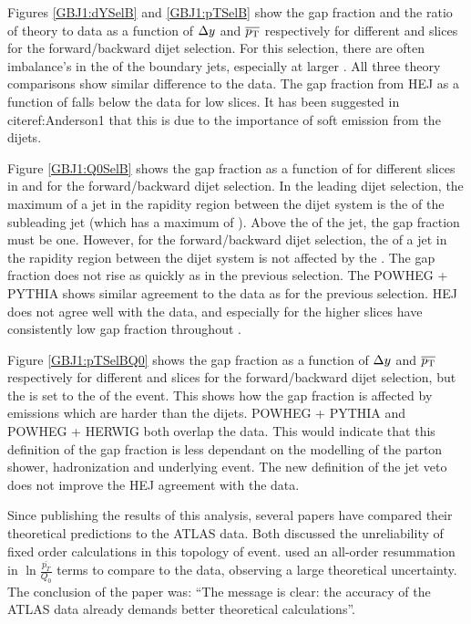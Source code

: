  
Figures \ref{GBJ1:dYSelB} and \ref{GBJ1:pTSelB} show the gap fraction and the ratio of theory to data as a function of $\mbox{$\Delta y$}{}$ and $\mbox{$\overline{p_{\rm T}}$}{}$ respectively for different \ptb{} and \dy{} slices for the forward/backward dijet selection.
For this selection, there are often imbalance's in the \pt{} of the boundary jets, especially at larger \ptb{}.
All three theory comparisons show similar difference to the data. 
The gap fraction from HEJ as a function of \dy{} falls below the data for low \ptb{} slices. 
It has been suggested in cite{ref:Anderson1} that this is due to the importance of soft emission from the dijets.

Figure \ref{GBJ1:Q0SelB} shows the gap fraction as a function of \qz{} for different slices in \dy{} and \ptb{} for the forward/backward dijet selection.
In the leading \pt{} dijet selection, the maximum \pt{} of a jet in the rapidity region between the dijet system is the \pt{} of the subleading jet (which has a maximum \pt{} of \ptb{}).
Above the \ptb{} of the jet, the gap fraction must be one.
However, for the forward/backward dijet selection, the \pt{} of a jet in the rapidity region between the dijet system is not affected by the \ptb{}.
The gap fraction does not rise as quickly as in the previous selection.
The POWHEG + PYTHIA  shows similar agreement to the data as for the previous selection.
HEJ does not agree well with the data, and especially for the higher \dy{} slices have consistently low gap fraction throughout \qz{}. 

Figure \ref{GBJ1:pTSelBQ0} shows the gap fraction as a function of $\mbox{$\Delta y$}{}$ and $\mbox{$\overline{p_{\rm T}}$}{}$ respectively for different \ptb{} and \dy{} slices for the forward/backward dijet selection, but the \qz{} is set to the \ptb{} of the event. 
This shows how the gap fraction is affected by emissions which are harder than the \ptb{} dijets. 
POWHEG + PYTHIA and POWHEG + HERWIG both overlap the data.
This would indicate that this definition of the gap fraction is less dependant on the modelling of the parton shower, hadronization and underlying event.
The new definition of the jet veto does not improve the HEJ agreement with the data.


Since publishing the results of this analysis, several papers \cite{ref:Anderson1,ref:JeffNew} have compared  their theoretical predictions to the ATLAS data. 
Both discussed the unreliability of fixed order calculations in this topology of event.
\cite{ref:JeffNew} used an all-order resummation in $\ln\frac{\bar{p_T}}{Q_0}$ terms to compare to the data, observing a large theoretical uncertainty. 
The conclusion of the paper was: ``The message is clear: the accuracy of the ATLAS data already demands better theoretical calculations''.


